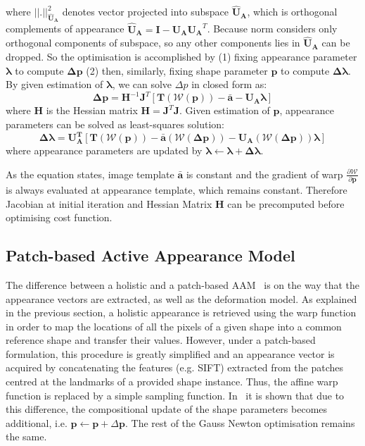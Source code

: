 where $||.||^2_{\bm{\hat{U}_A}}$ denotes vector projected into subspace $\bm{\hat{U}_A}$, which is orthogonal complements of appearance $\bm{\hat{U}_A}=\bm{I}-\bm{U_A} \bm{U_A}^T$. Because norm considers only orthogonal components of subspace, so any other components lies in $\bm{\hat{U}_A}$ can be dropped. So the optimisation is accomplished by (1) fixing appearance parameter $\bm{\lambda}$ to compute $\bm{\Delta p}$ (2) then, similarly, fixing shape parameter $\bm{p}$ to compute $\bm{\Delta\lambda}$. By given estimation of $\bm{\lambda}$, we can solve $\Delta p$ in closed form as: 
\begin{equation}
    \label{eq:dpic_ear}
    \bm{\Delta p}=\bm{H}^{-1}\bm{J}^T[\bm{T}(\mathcal{W}(\bm{p}))-\bm{\bar{a}}-\bm{U_A}\bm{\lambda}]
\end{equation}
where $\bm{H}$ is the Hessian matrix $\bm{H}=\bm{J}^T\bm{J}$. Given estimation of $\bm{p}$, appearance parameters can be solved as least-squares solution:
\begin{equation}
    \label{eq:lambdaic}
    \bm{\Delta \lambda}=\bm{U_A^T}[\bm{T}(\mathcal{W}(\bm{p}))-\bm{\bar{a}}(\mathcal{W}(\bm{\Delta p}))-\bm{U_A}(\mathcal{W}(\bm{\Delta p}))\bm{\lambda}]
\end{equation}
where appearance parameters are updated by $\bm{\lambda}\leftarrow\bm{\lambda}+\bm{\Delta \lambda}$. 

As the equation states, image template $\bm{\bar{a}}$ is constant and the gradient of warp $\frac{\partial \mathcal{W}}{\partial \bm{p}}$ is always evaluated at appearance template, which remains constant. Therefore Jacobian at initial iteration and Hessian Matrix $\bm{H}$ can be precomputed before optimising cost function.


\subsection{Patch-based Active Appearance Model} 
The difference between a holistic and a patch-based AAM~\cite{Tzimiropoulos2014} is on the way that the appearance vectors are extracted, as well as the deformation model. As explained in the previous section, a holistic appearance is retrieved using the warp function in order to map the locations of all the pixels of a given shape into a common reference shape and transfer their values. However, under a patch-based formulation, this procedure is greatly simplified and an appearance vector is acquired by concatenating the features (e.g. SIFT) extracted from the patches centred at the landmarks of a provided shape instance. Thus, the affine warp function is replaced by a simple sampling function. In~\cite{Tzimiropoulos2014} it is shown that due to this difference, the compositional update of the shape parameters becomes additional, i.e. $\mathbf{p}\leftarrow\mathbf{p} + \Delta\mathbf{p}$. The rest of the Gauss Newton optimisation remains the same.

